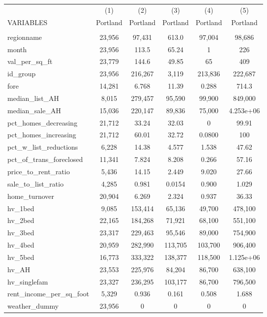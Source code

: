\begin{tabular}{lccccc} \hline
 & (1) & (2) & (3) & (4) & (5) \\
VARIABLES & Portland & Portland & Portland & Portland & Portland \\ \hline
 &  &  &  &  &  \\
regionname & 23,956 & 97,431 & 613.0 & 97,004 & 98,686 \\
month & 23,956 & 113.5 & 65.24 & 1 & 226 \\
val\_per\_sq\_ft & 23,779 & 144.6 & 49.85 & 65 & 409 \\
id\_group & 23,956 & 216,267 & 3,119 & 213,836 & 222,687 \\
fore & 14,281 & 6.768 & 11.39 & 0.288 & 714.3 \\
median\_list\_AH & 8,015 & 279,457 & 95,590 & 99,900 & 849,000 \\
median\_sale\_AH & 15,036 & 220,147 & 89,836 & 75,000 & 4.253e+06 \\
pct\_homes\_decreasing & 21,712 & 33.24 & 32.03 & 0 & 99.91 \\
pct\_homes\_increasing & 21,712 & 60.01 & 32.72 & 0.0800 & 100 \\
pct\_w\_list\_reductions & 6,228 & 14.38 & 4.577 & 1.538 & 47.62 \\
pct\_of\_trans\_foreclosed & 11,341 & 7.824 & 8.208 & 0.266 & 57.16 \\
price\_to\_rent\_ratio & 5,436 & 14.15 & 2.449 & 9.020 & 27.66 \\
sale\_to\_list\_ratio & 4,285 & 0.981 & 0.0154 & 0.900 & 1.029 \\
home\_turnover & 20,904 & 6.269 & 2.324 & 0.937 & 36.33 \\
hv\_1bed & 9,085 & 153,414 & 65,136 & 49,700 & 478,100 \\
hv\_2bed & 22,165 & 184,268 & 71,921 & 68,100 & 551,100 \\
hv\_3bed & 23,317 & 229,463 & 95,546 & 89,000 & 754,900 \\
hv\_4bed & 20,959 & 282,990 & 113,705 & 103,700 & 906,400 \\
hv\_5bed & 16,773 & 333,322 & 138,377 & 118,500 & 1.125e+06 \\
hv\_AH & 23,553 & 225,976 & 84,204 & 86,700 & 638,100 \\
hv\_singlefam & 23,327 & 236,295 & 103,177 & 86,700 & 796,500 \\
rent\_income\_per\_sq\_foot & 5,329 & 0.936 & 0.161 & 0.508 & 1.688 \\
weather\_dummy & 23,956 & 0 & 0 & 0 & 0 \\

\end{tabular}
